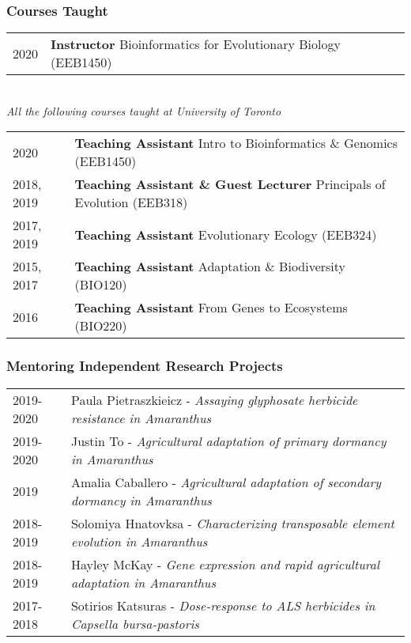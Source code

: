 \documentclass[12pt]{article}
\begin{document}
\subsubsection*{Courses Taught}
\begin{tabular}{ll}
2020 & \textbf{Instructor} Bioinformatics for Evolutionary Biology (EEB1450) \\
\end{tabular}
\medskip \\
\textit{All the following courses taught at University of Toronto} \\
\begin{tabular}{ll}
2020 & \textbf{Teaching Assistant} Intro to Bioinformatics \& Genomics (EEB1450) \\

2018, 2019 & \textbf{Teaching Assistant \& Guest Lecturer} Principals of Evolution (EEB318) \\
2017, 2019 & \textbf{Teaching Assistant} Evolutionary Ecology (EEB324) \\
2015, 2017 &  \textbf{Teaching Assistant} Adaptation \& Biodiversity (BIO120) \\
2016 &  \textbf{Teaching Assistant} From Genes to Ecosystems (BIO220) \\
\end{tabular}


\subsubsection*{Mentoring Independent Research Projects}
\begin{tabular}{ll}
2019-2020 & Paula Pietraszkieicz - \textit{Assaying glyphosate herbicide resistance in Amaranthus} \\
2019-2020 & Justin To - \textit{Agricultural adaptation of primary dormancy in Amaranthus} \\
2019 & Amalia Caballero - \textit{Agricultural adaptation of secondary dormancy in Amaranthus} \\
2018-2019 & Solomiya Hnatovksa - \textit{Characterizing transposable element evolution in Amaranthus} \\
2018-2019 & Hayley McKay - \textit{Gene expression and rapid agricultural adaptation in Amaranthus} \\
2017-2018 & Sotirios Katsuras - \textit{Dose-response to ALS herbicides in Capsella bursa-pastoris} \\
\end{tabular}
\end{document}
